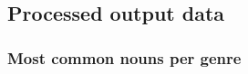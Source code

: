 \documentclass[                                                             %
        12pt,                                                                   %
        twoside                                                                 %
    ]{scrartcl}                                                                 %
\begin{document}

\subsection{Processed output data}


\subsubsection{Most common nouns per genre}
\end{document}
